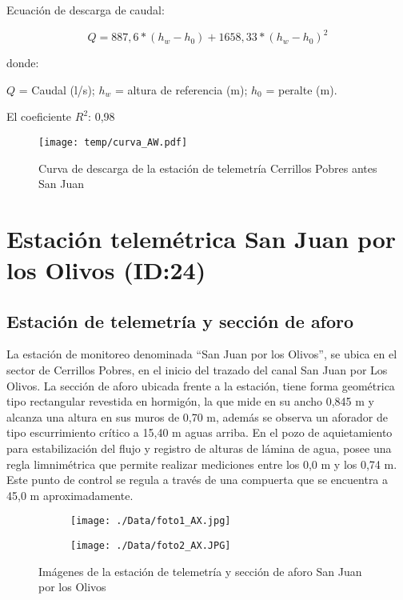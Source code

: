 \documentclass[]{article}
\begin{document}
Ecuación de descarga de caudal:

\[Q = 887,6*(h_w - h_0) + 1658,33*{(h_w - h_0)^2}\]

donde:

\(Q\) = Caudal (l/s); \(h_w\) = altura de referencia (m); \(h_0\) =
peralte (m).

El coeficiente \(R^2\): 0,98

\begin{figure}[H]
  \centering
  \texttt{[image: temp/curva\_AW.pdf]}
\caption{Curva de descarga de la estación de telemetría Cerrillos Pobres antes San Juan}
\label{fig:Curva_AW}
\end{figure}

\clearpage
\section{Estación telemétrica San Juan por los Olivos (ID:24)}

\subsection{Estación de telemetría y sección de aforo}

La estación de monitoreo denominada ``San Juan por los Olivos'', se ubica en el sector de Cerrillos Pobres, en el inicio del trazado del canal San Juan por Los Olivos. La sección de aforo ubicada frente a la estación, tiene forma geométrica tipo rectangular revestida en hormigón, la que mide en su ancho 0,845 m y alcanza una altura en sus muros de 0,70 m, además se observa un aforador de tipo escurrimiento crítico a 15,40 m aguas arriba. En el pozo de aquietamiento para estabilización del flujo y registro de alturas de lámina de agua, posee una regla limnimétrica que permite realizar mediciones entre los 0,0 m y los 0,74 m. Este punto de control se regula a través de una compuerta que se encuentra a 45,0 m aproximadamente.

\begin{figure}[H]
  \centering
\begin{subfigure}{.49\textwidth}
  \texttt{[image: ./Data/foto1\_AX.jpg]}
\end{subfigure}
\hfill
\begin{subfigure}{.49\textwidth}
  \texttt{[image: ./Data/foto2\_AX.JPG]}
\end{subfigure}
\caption{Imágenes de la estación de telemetría y sección de aforo San Juan por los Olivos}
\label{fig:fotos_24}
\end{figure}
\end{document}
